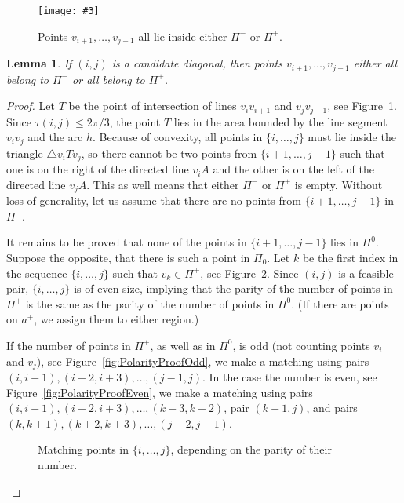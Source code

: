 \documentclass[a4paper, 11pt]{article}
\newtheorem{lemma}[theorem]{Lemma}
\newcommand{\fig}[3]{
	\begin{figure}[ht]
		\centering
		\texttt{[image: \#3]}
		\caption{#2}
		\label{#1}
	\end{figure}
}
\newcommand{\p}[2]{\{#1, \ldots, #2\}}
\newcommand{\pij}{\p{i}{j}}
\begin{document}
\fig{fig:Polarity}{Points $v_{i+1}, \ldots, v_{j-1}$ all lie inside either $\Pi^-$ or $\Pi^+$.}{Polarity.pdf}


\begin{lemma}
	\label{lem:Polarity}
	If $(i,j)$ is a candidate diagonal, then points $v_{i+1}, \ldots, v_{j-1}$ either all belong to $\Pi^-$ or all belong to $\Pi^+$.
\end{lemma}
\begin{proof}
	Let $T$ be the point of intersection of lines $v_iv_{i+1}$ and $v_jv_{j-1}$, see Figure~\ref{fig:Polarity}. Since $\tau(i,j) \leq 2\pi/3$, the point $T$ lies in the area bounded by the line segment $v_iv_j$ and the arc $h$. Because of convexity, all points in $\pij$ must lie inside the triangle $\triangle{v_iTv_j}$, so there cannot be two points from $\p{i+1}{j-1}$ such that one is on the right of the directed line $v_iA$ and the other is on the left of the directed line $v_jA$. This as well means that either $\Pi^-$ or $\Pi^+$ is empty. Without loss of generality, let us assume that there are no points from $\p{i+1}{j-1}$ in $\Pi^-$.
	
	It remains to be proved that none of the points in $\p{i+1}{j-1}$ lies in $\Pi^0$. Suppose the opposite, that there is such a point in $\Pi_0$. Let $k$ be the first index in the sequence $\pij$ such that $v_k \in \Pi^+$, see Figure~\ref{fig:PolarityProof}. Since $(i,j)$ is a feasible pair, $\pij$ is of even size, implying that the parity of the number of points in $\Pi^+$ is the same as the parity of the number of points in $\Pi^0$. (If there are points on $a^+$, we assign them to either region.)

	If the number of points in $\Pi^+$, as well as in $\Pi^0$, is odd (not counting points $v_i$ and $v_j$), see Figure~\ref{fig:PolarityProofOdd}, we make a matching using pairs $(i,i+1), (i+2,i+3), \ldots, (j-1,j)$. In the case the number is even, see Figure~\ref{fig:PolarityProofEven}, we make a matching using pairs $(i,i+1), (i+2,i+3), \ldots, (k-3,k-2)$, pair $(k-1,j)$, and pairs $(k,k+1), (k+2,k+3), \ldots, (j-2,j-1)$.
	
	\begin{figure}[ht]
		\centering
		\hspace{20pt}
		\caption{Matching points in $\pij$, depending on the parity of their number.}
		\label{fig:PolarityProof}
	\end{figure}
		

\end{proof}
\end{document}

